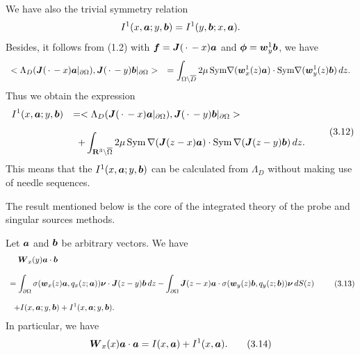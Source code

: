 We have also the trivial symmetry relation
$$\displaystyle
I^1(x,\mbox{\boldmath $a$};y,\mbox{\boldmath $b$})=I^1(y,\mbox{\boldmath $b$};x,\mbox{\boldmath $a$}).
$$
 Besides, it follows from (1.2) with $\mbox{\boldmath $f$}=\mbox{\boldmath $J$}(\,\cdot\,-x)\mbox{\boldmath $a$}$
 and $\mbox{\boldmath $\phi$}=\mbox{\boldmath $w$}_y^1\mbox{\boldmath $b$}$, we have
 $$\begin{array}{ll}
 \displaystyle
 <\Lambda_D(\mbox{\boldmath $J$}(\,\cdot\,-x)\mbox{\boldmath $a$}\vert_{\partial\Omega}),\mbox{\boldmath $J$}(\,\cdot\,-y)\mbox{\boldmath $b$}\vert_{\partial\Omega}>
 &
 \displaystyle
 =\int_{\Omega\setminus\overline{D}}2\mu\,\text{Sym}\nabla(\mbox{\boldmath $w$}_x^1(z)\mbox{\boldmath $a$})
\cdot\text{Sym}\nabla(\mbox{\boldmath $w$}_y^1(z)\mbox{\boldmath $b$})\,dz.
 \end{array}
 $$
 Thus we obtain the expression
 $$\begin{array}{ll}
 \displaystyle
 I^1(x,\mbox{\boldmath $a$};y,\mbox{\boldmath $b$})
 &
 \displaystyle
 =<\Lambda_D(\mbox{\boldmath $J$}(\,\cdot\,-x)\mbox{\boldmath $a$}\vert_{\partial\Omega}),
 \mbox{\boldmath $J$}(\,\cdot\,-y)\mbox{\boldmath $b$}\vert_{\partial\Omega}>
 \\
 \\
 \displaystyle
 &
 \displaystyle
 \,\,\,
 +\int_{\Bbb R^3\setminus\overline{\Omega}}
2\mu\,\text{Sym}\,\nabla(\mbox{\boldmath $J$}(z-x)\mbox{\boldmath $a$})
\cdot\text{Sym}\,\nabla(\mbox{\boldmath $J$}(z-y)\mbox{\boldmath $b$})\,dz.
\end{array}
\tag {3.12}
 $$
This means that the $I^1(x,\mbox{\boldmath $a$};y,\mbox{\boldmath $b$})$ can be calculated from $\Lambda_D$
without making use of needle sequences.


The result mentioned below is the core of the integrated theory of the probe and singular sources methods.

 Let $\mbox{\boldmath $a$}$ and $\mbox{\boldmath $b$}$ be arbitrary vectors.
 We have
$$\begin{array}{l}
\displaystyle
\,\,\,\,\,\,
\mbox{\boldmath $W$}_x(y)\mbox{\boldmath $a$}\cdot\mbox{\boldmath $b$}
\\
\\
\displaystyle
=\int_{\partial\Omega}\sigma(\mbox{\boldmath $w$}_x(z)\mbox{\boldmath $a$},q_x(z;\mbox{\boldmath $a$}))\mbox{\boldmath $\nu$}\cdot
\mbox{\boldmath $J$}(z-y)\mbox{\boldmath $b$}\,dz
-\int_{\partial\Omega}\mbox{\boldmath $J$}(z-x)\mbox{\boldmath $a$}
\cdot\sigma(\mbox{\boldmath $w$}_y(z)\mbox{\boldmath $b$},q_y(z;\mbox{\boldmath $b$}))
\mbox{\boldmath $\nu$}\,dS(z)
\\
\\
\displaystyle
\,\,\,
+I(x,\mbox{\boldmath $a$};y,\mbox{\boldmath $b$})+I^1(x,\mbox{\boldmath $a$};y,\mbox{\boldmath $b$}).
\end{array}
\tag {3.13}
$$
In particular, we have
$$\displaystyle
\mbox{\boldmath $W$}_x(x)\mbox{\boldmath $a$}\cdot\mbox{\boldmath $a$}
=I(x,\mbox{\boldmath $a$})+I^1(x,\mbox{\boldmath $a$}).
\tag {3.14}
$$
\endproclaim


